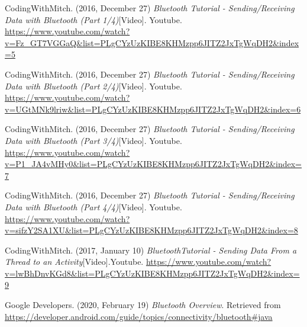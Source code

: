 \documentclass[12pt,a4paper]{article}
\begin{document}
    \begin{thebibliography}{9}
    
    
    CodingWithMitch. (2016, December 27)
    \textit{Bluetooth Tutorial - Sending/Receiving Data with Bluetooth (Part 1/4)}[Video].
    Youtube.
    \url{https://www.youtube.com/watch?v=Fz_GT7VGGaQ&list=PLgCYzUzKIBE8KHMzpp6JITZ2JxTgWqDH2&index=5}
    
    CodingWithMitch. (2016, December 27)
    \textit{Bluetooth Tutorial - Sending/Receiving Data with Bluetooth (Part 2/4)}[Video].
    Youtube.
    \url{https://www.youtube.com/watch?v=UGtMNk9lriw&list=PLgCYzUzKIBE8KHMzpp6JITZ2JxTgWqDH2&index=6}
    
    CodingWithMitch. (2016, December 27)
    \textit{Bluetooth Tutorial - Sending/Receiving Data with Bluetooth (Part 3/4)}[Video].
    Youtube.
    \url{https://www.youtube.com/watch?v=P1_JA4vMHy0&list=PLgCYzUzKIBE8KHMzpp6JITZ2JxTgWqDH2&index=7}
    
    CodingWithMitch. (2016, December 27)
    \textit{Bluetooth Tutorial - Sending/Receiving Data with Bluetooth (Part 4/4)}[Video].
    Youtube.
    \url{https://www.youtube.com/watch?v=sifzY2SA1XU&list=PLgCYzUzKIBE8KHMzpp6JITZ2JxTgWqDH2&index=8}
    
    CodingWithMitch. (2017, January 10)
    \textit{BluetoothTutorial - Sending Data From a Thread to an Activity}[Video].Youtube.
    \url{https://www.youtube.com/watch?v=lwBhDnvKGd8&list=PLgCYzUzKIBE8KHMzpp6JITZ2JxTgWqDH2&index=9}
    
    Google Developers. (2020, February 19)
    \textit{Bluetooth Overview}.
    Retrieved from
    \url{https://developer.android.com/guide/topics/connectivity/bluetooth#java}
    
    \end{thebibliography}
    \newpage
    
    \listoffigures
    \newpage

    \lstlistoflistings
    \newpage
\end{document}
